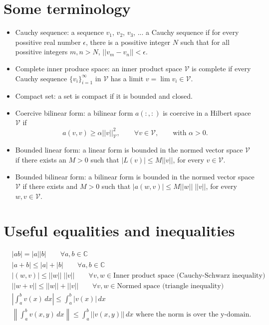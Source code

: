 \documentclass[oneside,a4paper,11pt]{report}
\begin{document}
\section{Some terminology}
\begin{itemize}
    \item Cauchy sequence: a sequence $v_1$, $v_2$, $v_3$, ... \@is a Cauchy sequence if for every possitive real number $\epsilon$, there is a possitive integer $N$ such that for all possitive integers $m,n>N$, $||v_m-v_n||<\epsilon$. 
    \item Complete inner produce space: an inner product space $\mathcal{V}$ is complete if every Cauchy sequence $\{v_i\}_{i=1}^\infty$ in $\mathcal{V}$ has a limit $v = \lim v_i \in \mathcal{V}$.
    \item Compact set: a set is compact if it is bounded and closed.
    \item Coercive bilinear form: a bilinear form $a(:,:)$ is coercive in a Hilbert space $\mathcal{V}$ if 
    \begin{equation}
        a(v,v) \ge \alpha ||v||_\mathcal{V}^2, \qquad \forall v \in \mathcal{V}, \qquad \text{with }\alpha > 0.
    \end{equation}
    \item Bounded linear form: a linear form is bounded in the normed vector space $\mathcal{V}$ if there exists an $M>0$ such that $|L(v)| \le M ||v||$, for every $v \in \mathcal{V}$. 
    \item Bounded bilinear form: a bilinear form is bounded in the normed vector space $\mathcal{V}$ if there exists and $M>0$ such that $|a(w,v)| \le M ||w||\;||v||$, for every $w,v \in \mathcal{V}$.
\end{itemize}

\section{Useful equalities and inequalities}
\begin{align}
    &|ab| = |a||b| \qquad \forall a,b \in \mathbb{C} \\
    &|a + b| \le |a| + |b| \qquad \forall a,b \in \mathbb{C} \\
    &|(w,v)| \le ||w||\;||v|| \qquad \forall v,w \in \text{Inner product space (Cauchy-Schwarz inequality)} \\
    &||w + v|| \le ||w|| + ||v|| \qquad \forall v,w \in \text{Normed space (triangle inequality)} \\
    &\left | \int_a^b v(x) \, dx \right| \le \int_a^b |v(x)| \, dx \\
    &\left \| \int_a^b v(x,y) \, dx \right \| \le \int_a^b ||v(x,y)|| \, dx \text{ where the norm is over the y-domain}.
\end{align}
\end{document}
